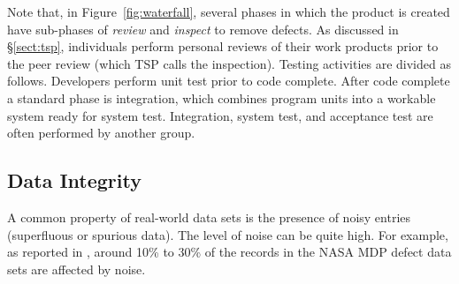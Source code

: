 \documentclass[smallcondensed]{svjour3}
\begin{document}

Note that, in Figure~\ref{fig:waterfall}, several  phases in which the product is created have sub-phases of {\em review} and {\em inspect} to remove defects. As discussed in \S\ref{sect:tsp}, individuals perform personal reviews of their work products prior to the peer review (which TSP calls the inspection). Testing activities are divided as follows. Developers perform unit test prior to code complete.  After code complete a standard phase is integration, which combines program units into a workable system ready for system test. Integration,  system test, and acceptance test are often performed by another group. 


    
 
\subsection{Data Integrity}
\label{sect:data_integrity}

A common property of real-world data sets is the presence
of noisy entries (superfluous  or spurious data). 
The level of noise can be quite high. For example, as reported
in \cite{shepperd12}, around
10\% to 30\%
of the records in the NASA MDP defect data sets are
affected by noise. 
\end{document}
